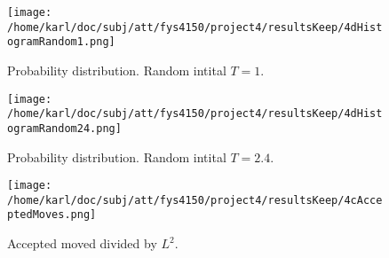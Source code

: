 \documentclass{article}
\begin{document}
\begin{minipage}{.45\textwidth} 
	\begin{figure}[H]
		\centering
		\texttt{[image: /home/karl/doc/subj/att/fys4150/project4/resultsKeep/4dHistogramRandom1.png]}
		\caption{Probability distribution. Random intital $T = 1$. \\ \textit{}}
		\label{1}
	\end{figure}
\end{minipage}\hfill
\begin{minipage}{.45\textwidth} 
	\begin{figure}[H]
		\centering
		\texttt{[image: /home/karl/doc/subj/att/fys4150/project4/resultsKeep/4dHistogramRandom24.png]}
		\caption{Probability distribution. Random intital $T = 2.4$.  \\ \textit{}}
		\label{1}
	\end{figure}
\end{minipage}\hfill
\vspace{2ex}

\begin{figure}[H]
	\centering
	\texttt{[image: /home/karl/doc/subj/att/fys4150/project4/resultsKeep/4cAcceptedMoves.png]}
	\caption{Accepted moved divided by $L^2$. \\ \textit{}}
	\label{1}
\end{figure}
\end{document}
